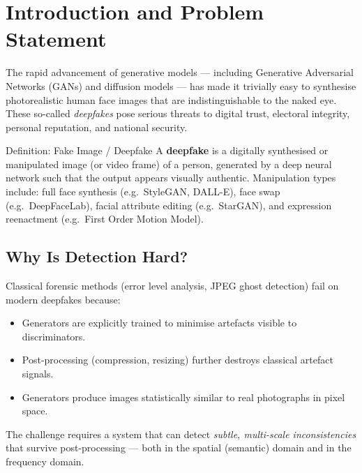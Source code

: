 \documentclass[12pt,a4paper]{article}
\begin{document}
\tableofcontents
\newpage

\section{Introduction and Problem Statement}

The rapid advancement of generative models --- including Generative Adversarial Networks
(GANs) and diffusion models --- has made it trivially easy to synthesise photorealistic
human face images that are indistinguishable to the naked eye. These so-called
\textit{deepfakes} pose serious threats to digital trust, electoral integrity, personal
reputation, and national security.

\begin{definitionbox}{Definition: Fake Image / Deepfake}
A \textbf{deepfake} is a digitally synthesised or manipulated image (or video frame) of
a person, generated by a deep neural network such that the output appears visually
authentic. Manipulation types include: full face synthesis (e.g.\ StyleGAN, DALL-E),
face swap (e.g.\ DeepFaceLab), facial attribute editing (e.g.\ StarGAN), and expression
reenactment (e.g.\ First Order Motion Model).
\end{definitionbox}

\subsection{Why Is Detection Hard?}

Classical forensic methods (error level analysis, JPEG ghost detection) fail on modern
deepfakes because:

\begin{itemize}[leftmargin=1.5em]
  \item Generators are explicitly trained to minimise artefacts visible to discriminators.
  \item Post-processing (compression, resizing) further destroys classical artefact signals.
  \item Generators produce images statistically similar to real photographs in pixel space.
\end{itemize}

The challenge requires a system that can detect \emph{subtle, multi-scale inconsistencies}
that survive post-processing --- both in the spatial (semantic) domain and in the
frequency domain.
\end{document}
